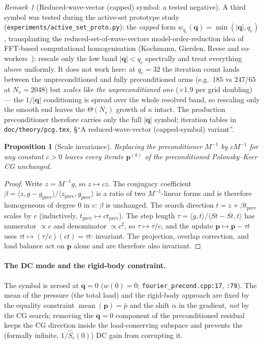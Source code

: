 \documentclass[11pt,a4paper]{article}
\newcommand{\abs}[1]{\left\lvert #1 \right\rvert}
\newcommand{\pp}{\mathbf{p}}
\newcommand{\code}[1]{\texttt{#1}}
\newtheorem{proposition}{Proposition}
\theoremstyle{definition}
\theoremstyle{remark}
\newtheorem{remark}{Remark}
\begin{document}
\begin{remark}[Reduced-wave-vector (capped) symbol: a tested negative]
\label{rem:capped}
A third symbol was tested during the active-set prototype study
(\code{experiments/active\_set\_proto.py}): the \emph{capped} form
$w_{q_c}(\mathbf q)=\min(\abs{\mathbf q},q_c)$, transplanting the
reduced-set-of-wave-vectors model-order-reduction idea of FFT-based
computational homogenisation (Kochmann, Gierden, Reese and
co-workers~\cite{GierdenEtAl2022}): rescale only the low band
$\abs{\mathbf q}<q_c$ spectrally and treat everything above uniformly. It
does not work here: at $q_c=32$ the iteration count lands between the
unpreconditioned and fully preconditioned arms (e.g.\ $185$ vs $247$/$65$ at
$N_s=2048$) but \emph{scales like the unpreconditioned one}
($\times1.9$ per grid doubling) --- the $1/\abs{\mathbf q}$ conditioning is
spread over the whole resolved band, so rescaling only the smooth end leaves
the $\Theta(N_s)$ growth of $\kappa$ intact. The production preconditioner
therefore carries only the full $\abs{\mathbf q}$ symbol; iteration tables in
\code{doc/theory/pcg.tex}, \S``A reduced-wave-vector (capped-symbol)
variant''.
\end{remark}

\begin{proposition}[Scale invariance]
\label{prop:scale}
Replacing the preconditioner $M^{-1}$ by $cM^{-1}$ for any constant $c>0$ leaves
every iterate $\pp^{(k)}$ of the preconditioned Polonsky--Keer CG unchanged.
\end{proposition}
\begin{proof}
Write $z=M^{-1}g$, so $z\mapsto cz$. The conjugacy coefficient
$\beta=\langle z,g-g_{\text{prev}}\rangle/\langle z_{\text{prev}},g_{\text{prev}}
\rangle$ is a ratio of two $M^{-1}$-linear forms and is therefore homogeneous of
degree $0$ in $c$: $\beta$ is unchanged. The search direction $t=z+\beta t_{\text{prev}}$
scales by $c$ (inductively, $t_{\text{prev}}\mapsto ct_{\text{prev}}$). The step
length $\tau=\langle g,t\rangle/\langle St-\overline{St},t\rangle$ has numerator
$\propto c$ and denominator $\propto c^2$, so $\tau\mapsto\tau/c$, and the update
$\pp\mapsto\pp-\tau t$ uses $\tau t\mapsto(\tau/c)(ct)=\tau t$: invariant. The
projection, overlap correction, and load balance act on $\pp$ alone and are
therefore also invariant.
\end{proof}

\paragraph{The DC mode and the rigid-body constraint.}
The symbol is zeroed at $\mathbf q=0$ ($w(0)=0$; \code{fourier\_precond.cpp:17},
\code{:79}). The mean of the pressure (the total load) and the rigid-body approach
are fixed by the equality constraint $\operatorname{mean}(\pp)=\bar p$ and the
shift $\alpha$ in the gradient, \emph{not} by the CG search; removing the
$\mathbf q=0$ component of the preconditioned residual keeps the CG direction
inside the load-conserving subspace and prevents the (formally infinite,
$1/\widehat S_c(0)$) DC gain from corrupting it.
\end{document}
